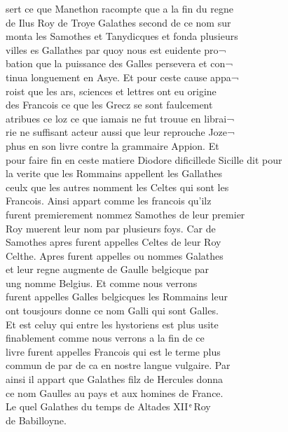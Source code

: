 \documentclass[12pt]{article}
\begin{document}
\newpage
sert ce que Manethon racompte que a la fin du regne\\
de Ilus Roy de Troye Galathes second de ce nom sur\\
monta les Samothes et Tanydicques et fonda plusieurs\\
villes es Gallathes par
          quoy nous est euidente pro¬\\
bation que la puissance des Galles persevera et
            con¬\\
tinua longuement en Asye. Et pour ceste cause appa¬\\
roist que
          les ars, sciences et lettres ont eu origine\\
des Francois ce que les Grecz se
          sont faulcement\\
atribues ce loz ce que iamais ne fut trouue en librai¬\\
rie ne suffisant acteur aussi que leur reprouche Joze¬\\
phus en son livre contre la grammaire Appion.
            Et\\
pour faire fin en ceste matiere Diodore dificillede Sicille dit pour\\
la verite que les Rommains appellent les Gallathes\\
ceulx que les autres nomment les Celtes qui sont les\\
Francois. Ainsi appart
          comme les francois qu'ilz\\
furent premierement nommez Samothes de leur
            premier\\
Roy muerent leur nom par plusieurs foys. Car de\\
Samothes
          apres furent appelles Celtes de leur Roy\\
Celthe. Apres furent appelles ou nommes Galathes\\
et leur regne
          augmente de Gaulle belgicque par\\
ung nomme Belgius. Et comme nous verrons\\
furent appelles
          Galles belgicques les Rommains leur\\
ont tousjours donne ce nom Galli qui sont
            Galles.\\
Et est celuy qui entre les hystoriens est plus usite\\
finablement comme nous verrons a la fin de ce\\
livre furent appelles Francois
          qui est le terme plus\\
commun de par de ca en nostre langue vulgaire. Par\\
ainsi il appart que Galathes filz de
            Hercules donna\\
ce nom Gaulles au
          pays et aux homines de France.\\
Le quel Galathes du temps de Altades XII ͤ Roy\\
 de
          Babilloyne.
\end{document}
